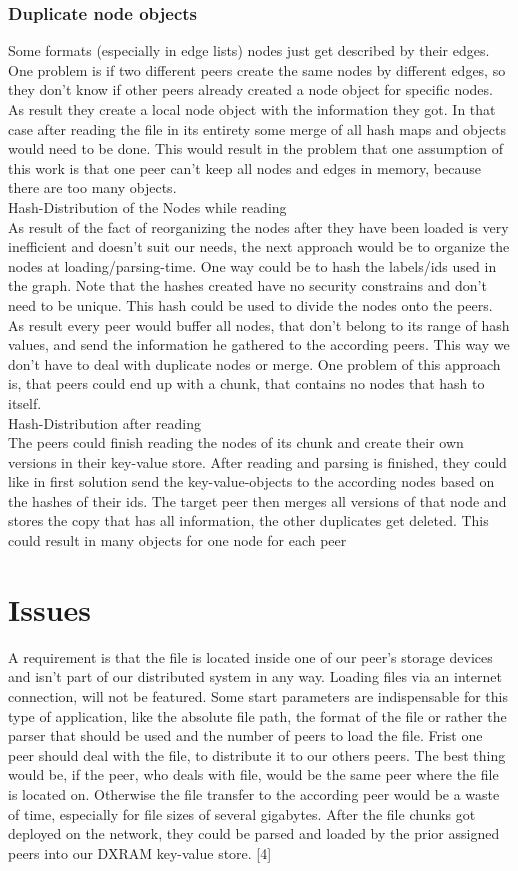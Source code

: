 \subsubsection{Duplicate node objects}
Some formats (especially in edge lists) nodes just get described by their edges. One problem is if two different peers create the same nodes by different edges, so they don't know if other peers already created a node object for specific nodes. As result they create a local node object with the information they got. In that case after reading the file in its entirety some merge of all hash maps and objects would need to be done. This would result in the problem that one assumption of this work is that one peer can't keep all nodes and edges in memory, because there are too many objects.\\
Hash-Distribution of the Nodes while reading\\
As result of the fact of reorganizing the nodes after they have been loaded is very inefficient and doesn't suit our needs, the next approach would be to organize the nodes at loading/parsing-time.
One way could be to hash the labels/ids used in the graph. Note that the hashes created have no security constrains and don't need to be unique. This hash could be used to divide the nodes onto the peers. As result every peer would buffer all nodes, that don't belong to its range of hash values, and send the information he gathered to the according peers. This way we don't have to deal with duplicate nodes or merge. One problem of this approach is, that peers could end up with a chunk, that contains no nodes that hash to itself.\\
Hash-Distribution after reading\\
The peers could finish reading the nodes of its chunk and create their own versions in their key-value store. After reading and parsing is finished, they could like in first solution send the key-value-objects to the according nodes based on the hashes of their ids. The target peer then merges all versions of that node and stores the copy that has all information, the other duplicates get deleted. This could result in many objects for one node for each peer

\section{Issues}
A requirement is that the file is located inside one of our peer's storage devices and isn't part of our distributed system in any way. Loading files via an internet connection, will not be featured. Some start parameters are indispensable for this type of application, like the absolute file path, the format of the file or rather the parser that should be used and the number of peers to load the file.
Frist one peer should deal with the file, to distribute it to our others peers. The best thing would be, if the peer, who deals with file, would be the same peer where the file is located on. Otherwise the file transfer to the according peer would be a waste of time, especially for file sizes of several gigabytes. After the file chunks got deployed on the network, they could be parsed and loaded by the prior assigned peers into our DXRAM key-value store. [4]


